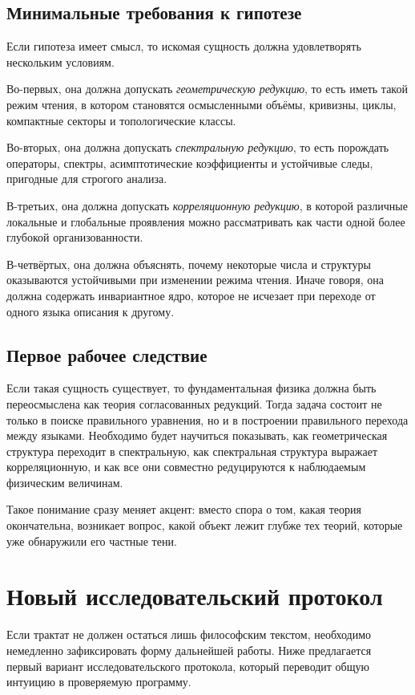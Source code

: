 \documentclass[12pt,a4paper]{article}
\begin{document}
\subsection{Минимальные требования к гипотезе}

Если гипотеза имеет смысл, то искомая сущность должна удовлетворять нескольким условиям.

Во-первых, она должна допускать \textit{геометрическую редукцию}, то есть иметь такой режим чтения, в котором становятся осмысленными объёмы, кривизны, циклы, компактные секторы и топологические классы.

Во-вторых, она должна допускать \textit{спектральную редукцию}, то есть порождать операторы, спектры, асимптотические коэффициенты и устойчивые следы, пригодные для строгого анализа.

В-третьих, она должна допускать \textit{корреляционную редукцию}, в которой различные локальные и глобальные проявления можно рассматривать как части одной более глубокой организованности.

В-четвёртых, она должна объяснять, почему некоторые числа и структуры оказываются устойчивыми при изменении режима чтения. Иначе говоря, она должна содержать инвариантное ядро, которое не исчезает при переходе от одного языка описания к другому.

\subsection{Первое рабочее следствие}

Если такая сущность существует, то фундаментальная физика должна быть переосмыслена как теория согласованных редукций. Тогда задача состоит не только в поиске правильного уравнения, но и в построении правильного перехода между языками. Необходимо будет научиться показывать, как геометрическая структура переходит в спектральную, как спектральная структура выражает корреляционную, и как все они совместно редуцируются к наблюдаемым физическим величинам.

Такое понимание сразу меняет акцент: вместо спора о том, какая теория окончательна, возникает вопрос, какой объект лежит глубже тех теорий, которые уже обнаружили его частные тени.

\section{Новый исследовательский протокол}

Если трактат не должен остаться лишь философским текстом, необходимо немедленно зафиксировать форму дальнейшей работы. Ниже предлагается первый вариант исследовательского протокола, который переводит общую интуицию в проверяемую программу.
\end{document}
